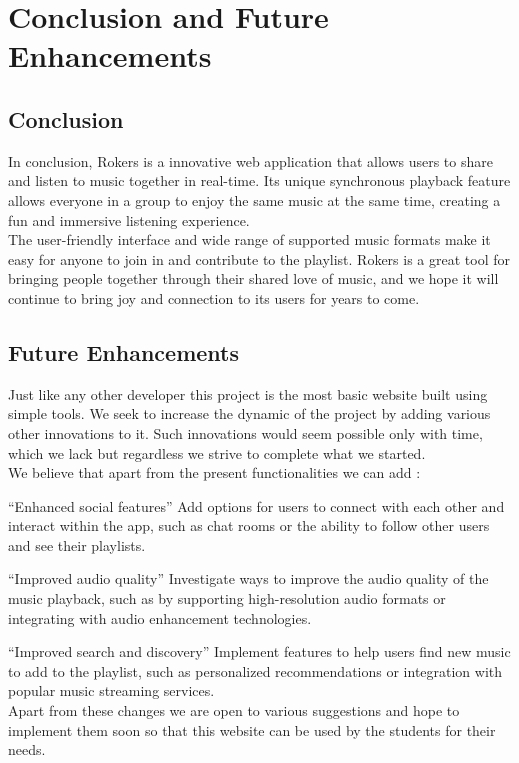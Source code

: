 \chapter{Conclusion and Future Enhancements}

\section{Conclusion}
In conclusion, Rokers is a innovative web application that allows users to share and listen to music together in real-time. Its unique synchronous playback feature allows everyone in a group to enjoy the same music at the same time, creating a fun and immersive listening experience.\\[0.1in] 

The user-friendly interface and wide range of supported music formats make it easy for anyone to join in and contribute to the playlist. Rokers is a great tool for bringing people together through their shared love of music, and we hope it will continue to bring joy and connection to its users for years to come.\\[0.1in]
\pagebreak

\section{Future Enhancements}
Just like any other developer this project is the most basic website built using simple tools. We seek to increase the dynamic of the project by adding various other innovations to it. Such innovations would seem possible only with time, which we lack but regardless we strive to complete what we started.\\[0.1in]

We believe that apart from the present functionalities we can add :

“Enhanced social features” Add options for users to connect with each other and interact within the app, such as chat rooms or the ability to follow other users and see their playlists.

“Improved audio quality” Investigate ways to improve the audio quality of the music playback, such as by supporting high-resolution audio formats or integrating with audio enhancement technologies.


“Improved search and discovery” Implement features to help users find new music to add to the playlist, such as personalized recommendations or integration with popular music streaming services.\\[0.1in]


Apart from these changes we are open to various suggestions and hope to implement them soon so that this website can be used by the students for their needs.






